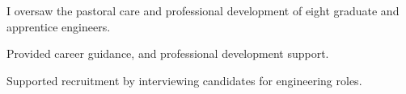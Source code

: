 I oversaw the pastoral care and professional development of eight graduate and apprentice engineers.
\vspace{0.25em}
\begin{tightemize}
  \item Provided career guidance, and professional development support. 
  \item Supported recruitment by interviewing candidates for engineering roles.
\end{tightemize}
\sectionsep{}
\vfill{}